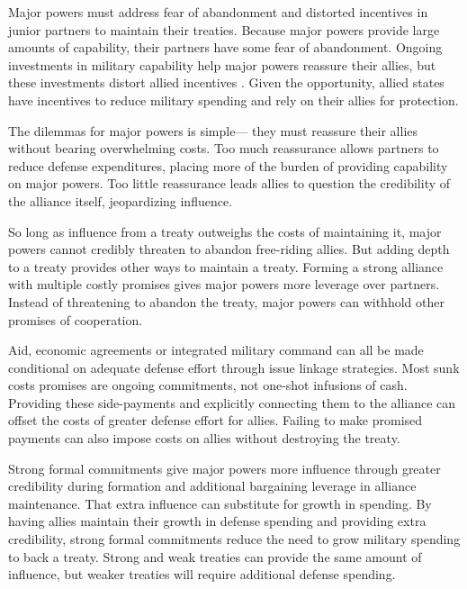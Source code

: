 \documentclass[12pt]{article}
\begin{document}
Major powers must address fear of abandonment and distorted incentives in junior partners to maintain their treaties. 
Because major powers provide large amounts of capability, their partners have some fear of abandonment. 
Ongoing investments in military capability help major powers reassure their allies, but these investments distort allied incentives \citep{Lake1996, Lake2009}. 
Given the opportunity, allied states have incentives to reduce military spending and rely on their allies for protection.


The dilemmas for major powers is simple--- they must reassure their allies without bearing overwhelming costs.
Too much reassurance allows partners to reduce defense expenditures, placing more of the burden of providing capability on major powers. 
Too little reassurance leads allies to question the credibility of the alliance itself, jeopardizing influence.   


So long as influence from a treaty outweighs the costs of maintaining it, major powers cannot credibly threaten to abandon free-riding allies. 
But adding depth to a treaty provides other ways to maintain a treaty.
Forming a strong alliance with multiple costly promises gives major powers more leverage over partners. 
Instead of threatening to abandon the treaty, major powers can withhold other promises of cooperation. 


Aid, economic agreements or integrated military command can all be made conditional on adequate defense effort through issue linkage strategies. 
Most sunk costs promises are ongoing commitments, not one-shot infusions of cash. 
Providing these side-payments and explicitly connecting them to the alliance can offset the costs of greater defense effort for allies. 
Failing to make promised payments can also impose costs on allies without destroying the treaty. 


Strong formal commitments give major powers more influence through greater credibility during formation and additional bargaining leverage in alliance maintenance. 
That extra influence can substitute for growth in spending. 
By having allies maintain their growth in defense spending and providing extra credibility, strong formal commitments reduce the need to grow military spending to back a treaty.
Strong and weak treaties can provide the same amount of influence, but weaker treaties will require additional defense spending.  
\end{document}
